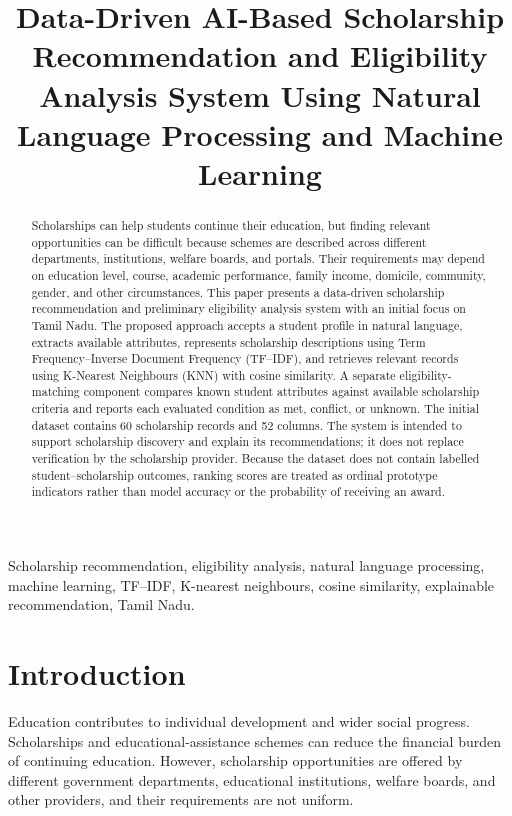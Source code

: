 \documentclass[conference]{IEEEtran}
\title{Data-Driven AI-Based Scholarship Recommendation and Eligibility Analysis System Using Natural Language Processing and Machine Learning}
\author{\IEEEauthorblockN{Author Name}
\IEEEauthorblockA{Department of Data Science and Machine Learning\\
Institution Name\\
Tamil Nadu, India\\
Email: author@email.com}}
\begin{document}
\maketitle

\begin{abstract}
Scholarships can help students continue their education, but finding relevant opportunities can be difficult because schemes are described across different departments, institutions, welfare boards, and portals. Their requirements may depend on education level, course, academic performance, family income, domicile, community, gender, and other circumstances. This paper presents a data-driven scholarship recommendation and preliminary eligibility analysis system with an initial focus on Tamil Nadu. The proposed approach accepts a student profile in natural language, extracts available attributes, represents scholarship descriptions using Term Frequency--Inverse Document Frequency (TF--IDF), and retrieves relevant records using K-Nearest Neighbours (KNN) with cosine similarity. A separate eligibility-matching component compares known student attributes against available scholarship criteria and reports each evaluated condition as met, conflict, or unknown. The initial dataset contains 60 scholarship records and 52 columns. The system is intended to support scholarship discovery and explain its recommendations; it does not replace verification by the scholarship provider. Because the dataset does not contain labelled student--scholarship outcomes, ranking scores are treated as ordinal prototype indicators rather than model accuracy or the probability of receiving an award.
\end{abstract}

\begin{IEEEkeywords}
Scholarship recommendation, eligibility analysis, natural language processing, machine learning, TF--IDF, K-nearest neighbours, cosine similarity, explainable recommendation, Tamil Nadu.
\end{IEEEkeywords}

\section{Introduction}
Education contributes to individual development and wider social progress. Scholarships and educational-assistance schemes can reduce the financial burden of continuing education. However, scholarship opportunities are offered by different government departments, educational institutions, welfare boards, and other providers, and their requirements are not uniform.
\end{document}
